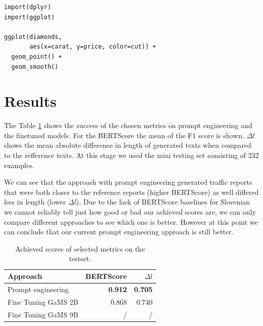 \documentclass[fleqn,moreauthors,10pt]{ds_report}
\begin{document}
\lstset{language=Python}


\lstset{language=R}
\begin{lstlisting}
import(dplyr)
import(ggplot)

ggplot(diamonds,
	   aes(x=carat, y=price, color=cut)) +
  geom_point() +
  geom_smooth()
\end{lstlisting}
\fi


\section*{Results}

The Table \ref{tab:evaluation} shows the success of the chosen metrics on prompt engineering and the finetuned models. For the BERTScore the mean of the F1 score is shown. $\Delta l$ shows the mean absolute difference in length of generated texts when compared to the refference texts. At this stage we used the mini testing set consisting of 232 examples.

We can see that the approach with prompt engineering generated traffic reports that were both closer to the reference reports (higher BERTScore) as well differed less in length (lower $\Delta l$). Due to the lack of BERTScore baselines for Slovenian we cannot reliably tell just how good or bad our achieved scores are, we can only compare different approaches to see which one is better. However at this point we can conclude that our current prompt engineering approach is still better.

\begin{table}[hbt]
	\caption{Achieved scores of selected metrics on the testset.}
	\centering
	\begin{tabular}{l | r r}
		\toprule
            Approach & BERTScore & $\Delta l$ \\
		\midrule
		Prompt engineering & \textbf{0.912} & \textbf{0.705}\\
		Fine Tuning GaMS 2B & 0.868 & 0.740 \\
		  Fine Tuning GaMS 9B & / & /\\
		\bottomrule
	\end{tabular}
	\label{tab:evaluation}
\end{table}
\end{document}
